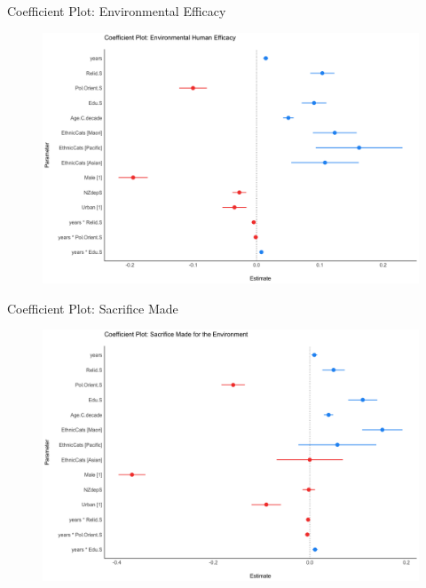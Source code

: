 \documentclass{beamer}
\begin{document}
\begin{frame}{Coefficient Plot: Environmental Efficacy}
\begin{figure}
\includegraphics[width=.99\textwidth,height=\textheight,keepaspectratio]{Figures/mEFFICACY.png}
\end{figure}
\end{frame}

\begin{frame}{Coefficient Plot: Sacrifice Made}
\begin{figure}
\includegraphics[width=.99\textwidth,height=\textheight,keepaspectratio]{Figures/mSACRIFICEMADE.png}
\end{figure}
\end{frame}
\end{document}
